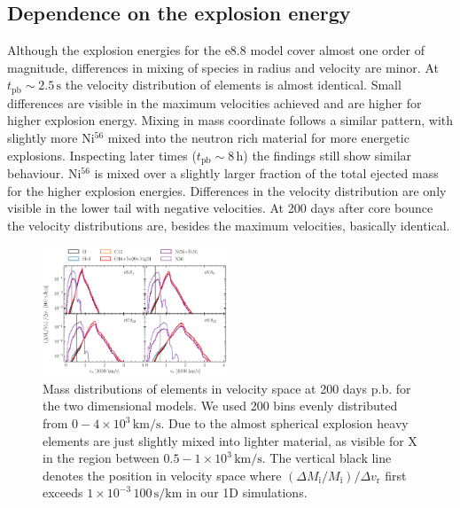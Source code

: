 \documentclass[fleqn,usenatbib]{mnras}
\newcommand{\nickel}{$\mathrm{Ni^{56}}$\xspace}
\newcommand{\tracer}{$\mathrm{X}$\xspace}
\begin{document}
\subsection{Dependence on the explosion energy}
\label{sec:Dependence on the explosion energy}
Although the explosion energies for the e8.8 model cover almost one order of magnitude, differences in mixing of species in radius and velocity are minor. At $t_{\mathrm{pb}}\sim 2.5 \,\text{s}$ the velocity distribution of elements is almost identical. Small differences are visible in the maximum velocities achieved and are higher for higher explosion energy. Mixing in mass coordinate follows a similar pattern, with slightly more \nickel mixed into the neutron rich material for more energetic explosions. 
Inspecting later times ($t_{\mathrm{pb}}\sim 8 \,\mathrm{h}$) the findings still show similar behaviour. \nickel is mixed over a slightly larger fraction of the total ejected mass for the higher explosion energies. Differences in the velocity distribution are only visible in the lower tail with negative velocities. 
At 200 days after core bounce the velocity distributions are, besides the maximum velocities, basically identical.
\begin{figure}
 \label{fig:e8_massDis_32d}
 \centering
 \includegraphics[width=0.49\textwidth]{pic/massDis_mvr_all_time_200d.pdf}
 \caption{Mass distributions of elements in velocity space at 200 days p.b. for the two dimensional models. We used 200 bins evenly distributed from  $0-4\times 10^3\,\mathrm{km/s}$. Due to the almost spherical explosion heavy elements are just slightly mixed into lighter material, as visible for \tracer in the region between $0.5-1\times 10^3\,\mathrm{km/s}$. The vertical black line denotes the position in velocity space where $(\Delta M_{\mathrm{i}}/M_{\mathrm{i}})/\Delta v_{\mathrm{r}}$ first exceeds $1\times 10^{-3}\,\mathrm{100\,s/km}$ in our 1D simulations.}
\end{figure}
\end{document}
